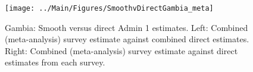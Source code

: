 \documentclass[12pt]{article}\usepackage[]{graphicx}\usepackage[]{color}
\newenvironment{knitrout}{}{} %
\begin{document}

\begin{knitrout}
\color{fgcolor}\begin{figure}[bht]

{\centering \texttt{[image: ../Main/Figures/SmoothvDirectGambia\_meta]} 

}

\caption[Gambia]{Gambia: Smooth versus direct Admin 1 estimates. Left: Combined (meta-analysis) survey estimate against combined direct estimates. Right: Combined (meta-analysis) survey estimate against direct estimates from each survey.}\label{fig:unnamed-chunk-133}
\end{figure}


\end{knitrout}
\end{document}
